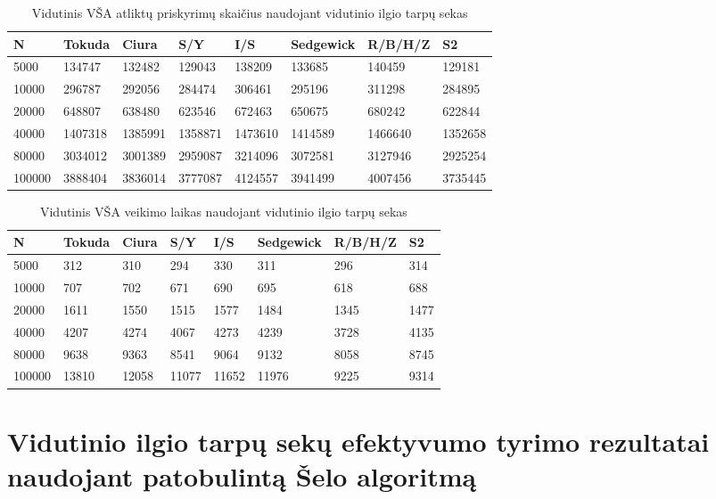 \documentclass{VUMIFInfKursinis}
\begin{document}
\begin{table}[H]
  \caption{Vidutinis VŠA atliktų priskyrimų skaičius naudojant vidutinio ilgio tarpų sekas}
  \label{tss_medium_assignments}
  \begin{tabular}{|l|l|l|l|l|l|l|l|}
  \hline
  N      & Tokuda  & Ciura   & S/Y     & I/S     & Sedgewick & R/B/H/Z & S2     \\ \hline
  5000   & 134747  & 132482  & 129043  & 138209  & 133685    & 140459  & 129181  \\ \hline
  10000  & 296787  & 292056  & 284474  & 306461  & 295196    & 311298  & 284895  \\ \hline
  20000  & 648807  & 638480  & 623546  & 672463  & 650675    & 680242  & 622844  \\ \hline
  40000  & 1407318 & 1385991 & 1358871 & 1473610 & 1414589   & 1466640 & 1352658 \\ \hline
  80000  & 3034012 & 3001389 & 2959087 & 3214096 & 3072581   & 3127946 & 2925254 \\ \hline
  100000 & 3888404 & 3836014 & 3777087 & 4124557 & 3941499   & 4007456 & 3735445 \\ \hline
  \end{tabular}
\end{table}

\begin{table}[H]
  \caption{Vidutinis VŠA veikimo laikas naudojant vidutinio ilgio tarpų sekas}
  \label{tss_medium_runtimes}
  \begin{tabular}{|l|l|l|l|l|l|l|l|}
  \hline
  N      & Tokuda & Ciura & S/Y   & I/S   & Sedgewick & R/B/H/Z & S2  \\ \hline
  5000   & 312    & 310   & 294   & 330   & 311       & 296     & 314  \\ \hline
  10000  & 707    & 702   & 671   & 690   & 695       & 618     & 688  \\ \hline
  20000  & 1611   & 1550  & 1515  & 1577  & 1484      & 1345    & 1477 \\ \hline
  40000  & 4207   & 4274  & 4067  & 4273  & 4239      & 3728    & 4135 \\ \hline
  80000  & 9638   & 9363  & 8541  & 9064  & 9132      & 8058    & 8745 \\ \hline
  100000 & 13810  & 12058 & 11077 & 11652 & 11976     & 9225    & 9314 \\ \hline
  \end{tabular}
\end{table}

\section{Vidutinio ilgio tarpų sekų efektyvumo tyrimo rezultatai naudojant patobulintą Šelo algoritmą}
\end{document}
